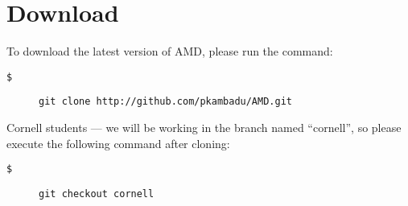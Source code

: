\section{Download}

To download the latest version of AMD, please run the command:

\begin{description}
\item [{\texttt{\$}}] 
\texttt{git clone http://github.com/pkambadu/AMD.git}
\end{description}

Cornell students --- we will be working in the branch named ``cornell'', so 
please execute the following command after cloning:

\begin{description}
\item [{\texttt{\$}}] 
\texttt{git checkout cornell}
\end{description}
